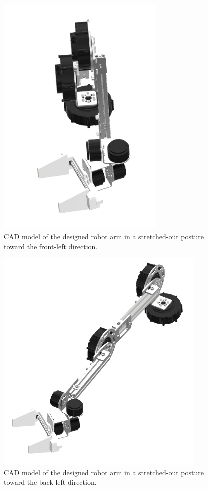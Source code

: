 \begin{figure}[h]
  \centering
  \includegraphics[width=8cm]{images/design/hidaritika.png}
  \caption{CAD model of the designed robot arm in a stretched-out posture toward the front-left direction.}
  \label{fig:move3}
\end{figure}

\begin{figure}[h]
  \centering
  \includegraphics[width=10cm]{images/design/hidarioku.png}
  \caption{CAD model of the designed robot arm in a stretched-out posture toward the back-left direction.}
  \label{fig:move4}
\end{figure}
\clearpage

